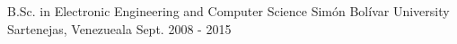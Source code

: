 \begin{cventries}
  \cventry
    {B.Sc. in Electronic Engineering and Computer Science}
    {Sim\'on Bol\'ivar University}
    {Sartenejas, Venezueala}
    {Sept. 2008 - 2015}{}
    \vspace*{-4mm}
\end{cventries}